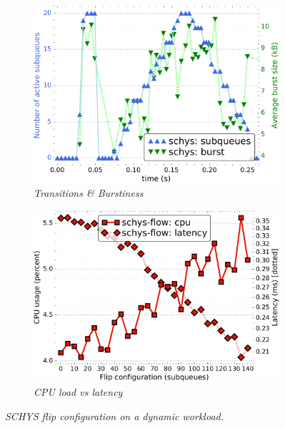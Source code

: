 \begin{figure}[t]
    \centering
	\begin{subfigure}[t]{.48\linewidth}
		\centering\includegraphics[width=0.99\linewidth]{figs/time_subqueues_burst_schys.pdf}
    \caption{\small{\textit{Transitions \& Burstiness}}}
	\label{fig:schys-time}

	\end{subfigure}
	\begin{subfigure}[t]{.48\linewidth}
		\centering
        \includegraphics[width=0.99\linewidth]{figs/flip_cn_2t64x1_mn_2tb2x3_kp_lat_schys.pdf}
    \caption{\small{\textit{CPU load vs latency}}}
	\label{fig:schys-cpu-lat}

	\end{subfigure}
 \vspace{-4mm}
    \caption{\small{\textit{SCHYS flip configuration on a dynamic workload.}}}
    \label{fig:schys}
    \vspace{-5mm}
\end{figure}
